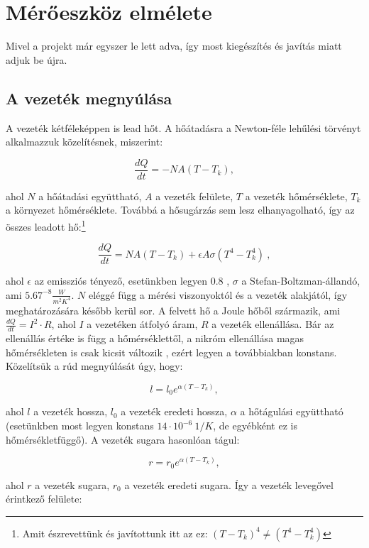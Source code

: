 \documentclass[a4paper, 10pt, oneside]{article}
\begin{document}
\section{Mérőeszköz elmélete}

Mivel a projekt már egyszer le lett adva, így most kiegészítés és javítás miatt adjuk be újra.

\subsection{A vezeték megnyúlása}
	A vezeték kétféleképpen is lead hőt. A hőátadásra a Newton-féle lehűlési törvényt alkalmazzuk 
	közelítésnek, miszerint: 

	\[ \frac{dQ}{dt}=-NA(T-T_k), \]

	\indent ahol $N$ a hőátadási együttható, $A$ a vezeték 
	felülete, $T$ a vezeték hőmérséklete, $T_k$ a környezet hőmérséklete. Továbbá a hősugárzás sem lesz 
	elhanyagolható, így az összes leadott hő:\footnote{Amit észrevettünk és javítottunk itt az ez: $(T-T_k)^4 \neq (T^4-T_k^4)$ \checkmark}
	
	\begin{equation}
		\boxed{\frac{dQ}{dt}=NA(T-T_k)+\epsilon A \sigma(T^4 - T_k^4)}\ ,
		\label{eq:main}
	\end{equation}

	\indent ahol $\epsilon$ az emissziós tényező, 
	esetünkben legyen 0.8 \cite{epsilon}, $\sigma$ a Stefan-Boltzman-állandó, ami 
	$5.67^{-8} \frac{W}{m^2 K^4}$. $N$ eléggé függ a mérési viszonyoktól és a vezeték alakjától, 
	így meghatározására később kerül sor. A felvett hő a Joule hőből származik, ami
	$\frac{dQ}{dt}=I^2 \cdot R$, ahol $I$ a vezetéken átfolyó áram, $R$ a vezeték ellenállása. Bár az 
	ellenállás értéke is függ a hőmérséklettől, a nikróm ellenállása magas hőmérsékleten is csak kicsit 
	változik \cite{R-T}, ezért legyen a továbbiakban konstans.\\ 
	\indent Közelítsük a rúd megnyúlását úgy, hogy: 

	\[ l=l_0e^{\alpha(T-T_k)}, \]

	\indent ahol $l$ a vezeték hossza, $l_0$ a vezeték eredeti hossza, $\alpha$ a 
	hőtágulási együttható (esetünkben most legyen konstans $14 \cdot 10^{-6}\ 1/K$, de egyébként ez is 
	hőmérsékletfüggő). A vezeték sugara hasonlóan tágul:
	
	\[ r=r_0e^{\alpha(T-T_k)}, \]

	ahol $r$ a vezeték sugara, $r_0$ a vezeték eredeti sugara. Így a vezeték levegővel érintkező felülete:
	
\end{document}
